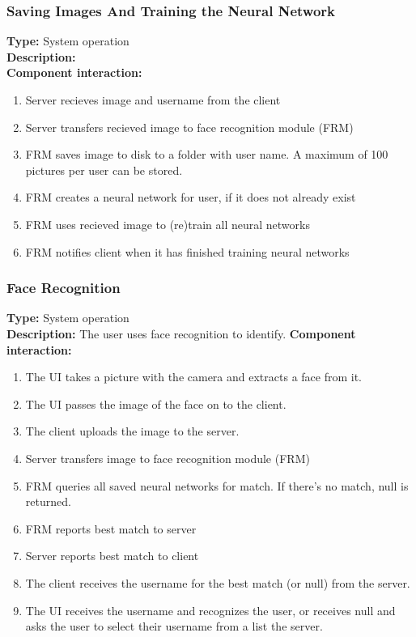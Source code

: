 \documentclass[11pt]{article}
\begin{document}
\subsubsection{Saving Images And Training the Neural Network}
\label{sec:add-train}
\textbf{Type:} System operation\\
\textbf{Description:}\\
\textbf{Component interaction:}\\
\begin{enumerate}
\item{Server recieves image and username from the client}
\item{Server transfers recieved image to face recognition module (FRM)}
\item{FRM saves image to disk to a folder with user name. A maximum of 100 pictures per user can be stored.}
\item{FRM creates a neural network for user, if it does not already exist}
\item{FRM uses recieved image to (re)train all neural networks}
\item{FRM notifies client when it has finished training neural networks}
\end{enumerate}

\subsubsection{Face Recognition}
\label{sec:recognition}
\textbf{Type:} System operation\\
\textbf{Description:} The user uses face recognition to identify.
\textbf{Component interaction:}
\begin{enumerate}
\item{The UI takes a picture with the camera and extracts a face from it.}
\item{The UI passes the image of the face on to the client.}
\item{The client uploads the image to the server.}
\item{Server transfers image to face recognition module (FRM)}
\item{FRM queries all saved neural networks for match. If there's no match, null is returned.}
\item{FRM reports best match to server}
\item{Server reports best match to client}
\item{The client receives the username for the best match (or null) from the server.}
\item{The UI receives the username and recognizes the user, or receives null and asks the user to select their username from a list the server.}
\end{enumerate}
\end{document}
